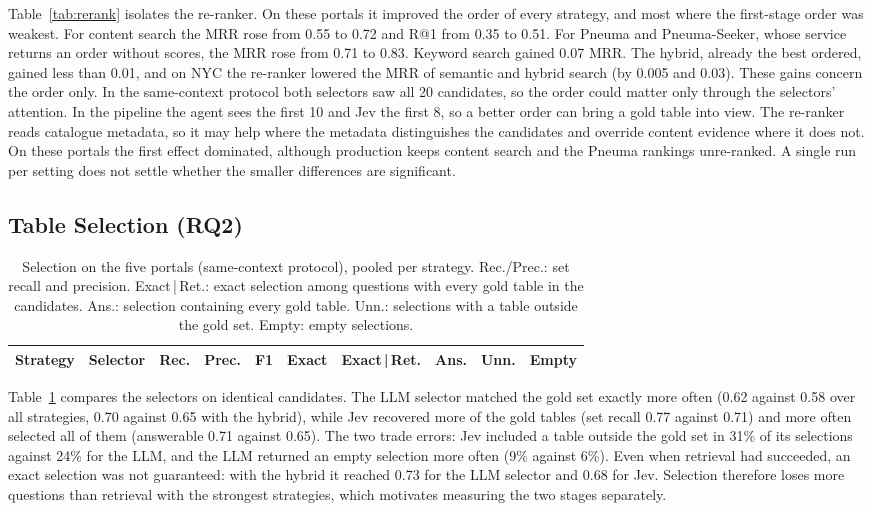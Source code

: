 Table~\ref{tab:rerank} isolates the re-ranker. On these portals it improved
the order of every strategy, and most where the first-stage order was weakest.
For content search the MRR rose from 0.55 to 0.72 and R@1 from 0.35 to 0.51.
For Pneuma and Pneuma-Seeker, whose service returns an order without scores,
the MRR rose from 0.71 to 0.83. Keyword search gained 0.07 MRR. The hybrid,
already the best ordered, gained less than 0.01, and on NYC the re-ranker
lowered the MRR of semantic and hybrid search (by 0.005 and 0.03). These gains concern
the order only. In the same-context protocol both selectors saw all 20
candidates, so the order could matter only through the selectors' attention.
In the pipeline the agent sees the first 10 and Jev the first 8, so a better
order can bring a gold table into view. The re-ranker reads catalogue
metadata, so it may help where the metadata distinguishes the candidates and
override content evidence where it does not. On these portals the first
effect dominated, although production keeps content search and the Pneuma
rankings unre-ranked. A single run per setting does not settle whether the
smaller differences are significant.

\subsection{Table Selection (RQ2)}
\label{sec:results-selection}

\begin{table}[t]
\caption{Selection on the five portals (same-context protocol), pooled per
strategy. Rec./Prec.: set recall and precision. Exact\,|\,Ret.: exact
selection among questions with every gold table in the candidates. Ans.:
selection containing every gold table. Unn.: selections with a table outside
the gold set. Empty: empty selections.}
\label{tab:selection}
\centering
\small
\setlength{\tabcolsep}{3pt}
\begin{tabular}{ll|ccc|cc|ccc}
\hline
Strategy & Selector & Rec. & Prec. & F1 & Exact & Exact\,|\,Ret. & Ans. & Unn. & Empty \\
\hline
\end{tabular}
\end{table}

Table~\ref{tab:selection} compares the selectors on identical candidates. The
LLM selector matched the gold set exactly more often (0.62 against 0.58 over
all strategies, 0.70 against 0.65 with the hybrid), while Jev recovered more
of the gold tables (set recall 0.77 against 0.71) and more often selected all
of them (answerable 0.71 against 0.65). The two trade errors: Jev included a
table outside the gold set in 31\% of its selections against 24\% for the
LLM, and the LLM returned an empty selection more often (9\% against 6\%). Even
when retrieval had succeeded, an exact selection was not guaranteed: with
the hybrid it reached 0.73 for the LLM selector and 0.68 for Jev. Selection
therefore loses more questions than retrieval with the strongest strategies,
which motivates measuring the two stages separately.

